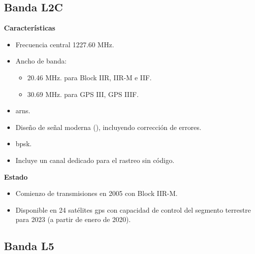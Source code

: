 \subsection{Banda L2C}

\begin{justify}
    \textbf{Características}
    \begin{itemize}[itemsep=2pt]
        \item Frecuencia central 1227.60 MHz.
        \item Ancho de banda:
        \begin{itemize}
            \item 20.46 MHz. para Block IIR, IIR-M e IIF.
            \item 30.69 MHz. para GPS III, GPS IIIF.
        \end{itemize}
        \item \gls{arns}.
        \item Diseño de señal moderna (), incluyendo corrección de errores.
        \item \gls{bpsk}.
        \item Incluye un canal dedicado para el rastreo sin código.
    \end{itemize}

    \noindent\textbf{Estado}
    \begin{itemize}
        \item Comienzo de transmisiones en 2005 con Block IIR-M.
        \item Disponible en 24 satélites \gls{gps} con capacidad de control del segmento terrestre para 2023 (a partir de enero de 2020).
    \end{itemize}
\end{justify}

\subsection{Banda L5}

